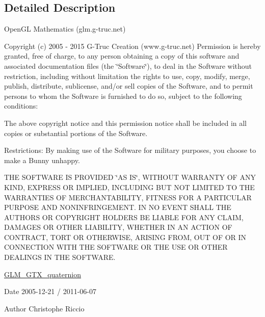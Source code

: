 \subsection{Detailed Description}
Open\-G\-L Mathematics (glm.\-g-\/truc.\-net)

Copyright (c) 2005 -\/ 2015 G-\/\-Truc Creation (www.\-g-\/truc.\-net) Permission is hereby granted, free of charge, to any person obtaining a copy of this software and associated documentation files (the \char`\"{}\-Software\char`\"{}), to deal in the Software without restriction, including without limitation the rights to use, copy, modify, merge, publish, distribute, sublicense, and/or sell copies of the Software, and to permit persons to whom the Software is furnished to do so, subject to the following conditions\-:

The above copyright notice and this permission notice shall be included in all copies or substantial portions of the Software.

Restrictions\-: By making use of the Software for military purposes, you choose to make a Bunny unhappy.

T\-H\-E S\-O\-F\-T\-W\-A\-R\-E I\-S P\-R\-O\-V\-I\-D\-E\-D \char`\"{}\-A\-S I\-S\char`\"{}, W\-I\-T\-H\-O\-U\-T W\-A\-R\-R\-A\-N\-T\-Y O\-F A\-N\-Y K\-I\-N\-D, E\-X\-P\-R\-E\-S\-S O\-R I\-M\-P\-L\-I\-E\-D, I\-N\-C\-L\-U\-D\-I\-N\-G B\-U\-T N\-O\-T L\-I\-M\-I\-T\-E\-D T\-O T\-H\-E W\-A\-R\-R\-A\-N\-T\-I\-E\-S O\-F M\-E\-R\-C\-H\-A\-N\-T\-A\-B\-I\-L\-I\-T\-Y, F\-I\-T\-N\-E\-S\-S F\-O\-R A P\-A\-R\-T\-I\-C\-U\-L\-A\-R P\-U\-R\-P\-O\-S\-E A\-N\-D N\-O\-N\-I\-N\-F\-R\-I\-N\-G\-E\-M\-E\-N\-T. I\-N N\-O E\-V\-E\-N\-T S\-H\-A\-L\-L T\-H\-E A\-U\-T\-H\-O\-R\-S O\-R C\-O\-P\-Y\-R\-I\-G\-H\-T H\-O\-L\-D\-E\-R\-S B\-E L\-I\-A\-B\-L\-E F\-O\-R A\-N\-Y C\-L\-A\-I\-M, D\-A\-M\-A\-G\-E\-S O\-R O\-T\-H\-E\-R L\-I\-A\-B\-I\-L\-I\-T\-Y, W\-H\-E\-T\-H\-E\-R I\-N A\-N A\-C\-T\-I\-O\-N O\-F C\-O\-N\-T\-R\-A\-C\-T, T\-O\-R\-T O\-R O\-T\-H\-E\-R\-W\-I\-S\-E, A\-R\-I\-S\-I\-N\-G F\-R\-O\-M, O\-U\-T O\-F O\-R I\-N C\-O\-N\-N\-E\-C\-T\-I\-O\-N W\-I\-T\-H T\-H\-E S\-O\-F\-T\-W\-A\-R\-E O\-R T\-H\-E U\-S\-E O\-R O\-T\-H\-E\-R D\-E\-A\-L\-I\-N\-G\-S I\-N T\-H\-E S\-O\-F\-T\-W\-A\-R\-E.

\hyperlink{group__gtx__quaternion}{G\-L\-M\-\_\-\-G\-T\-X\-\_\-quaternion}

\begin{DoxyDate}{Date}
2005-\/12-\/21 / 2011-\/06-\/07 
\end{DoxyDate}
\begin{DoxyAuthor}{Author}
Christophe Riccio 
\end{DoxyAuthor}
